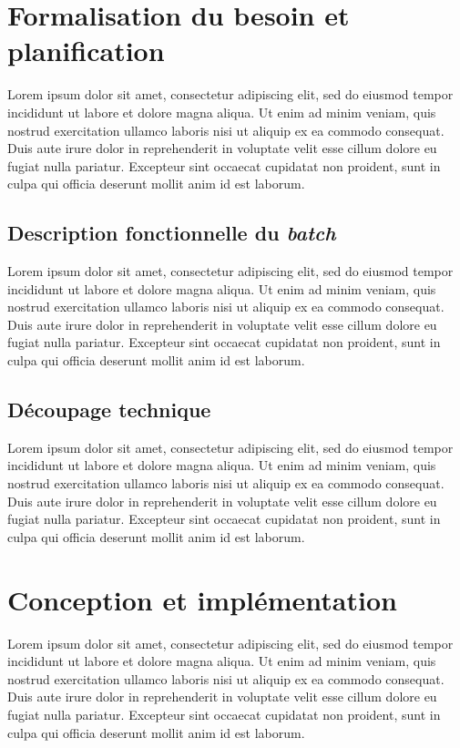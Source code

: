 \documentclass[a4paper, 12pt]{report}
\begin{document}
\section{Formalisation du besoin et planification}

Lorem ipsum dolor sit amet, consectetur adipiscing elit, sed do eiusmod tempor incididunt ut labore et dolore magna aliqua. Ut enim ad minim veniam, quis nostrud exercitation ullamco laboris nisi ut aliquip ex ea commodo consequat. Duis aute irure dolor in reprehenderit in voluptate velit esse cillum dolore eu fugiat nulla pariatur. Excepteur sint occaecat cupidatat non proident, sunt in culpa qui officia deserunt mollit anim id est laborum.

\subsection{Description fonctionnelle du \textit{batch}}

Lorem ipsum dolor sit amet, consectetur adipiscing elit, sed do eiusmod tempor incididunt ut labore et dolore magna aliqua. Ut enim ad minim veniam, quis nostrud exercitation ullamco laboris nisi ut aliquip ex ea commodo consequat. Duis aute irure dolor in reprehenderit in voluptate velit esse cillum dolore eu fugiat nulla pariatur. Excepteur sint occaecat cupidatat non proident, sunt in culpa qui officia deserunt mollit anim id est laborum.

\subsection{Découpage technique}

Lorem ipsum dolor sit amet, consectetur adipiscing elit, sed do eiusmod tempor incididunt ut labore et dolore magna aliqua. Ut enim ad minim veniam, quis nostrud exercitation ullamco laboris nisi ut aliquip ex ea commodo consequat. Duis aute irure dolor in reprehenderit in voluptate velit esse cillum dolore eu fugiat nulla pariatur. Excepteur sint occaecat cupidatat non proident, sunt in culpa qui officia deserunt mollit anim id est laborum.

\section{Conception et implémentation}

Lorem ipsum dolor sit amet, consectetur adipiscing elit, sed do eiusmod tempor incididunt ut labore et dolore magna aliqua. Ut enim ad minim veniam, quis nostrud exercitation ullamco laboris nisi ut aliquip ex ea commodo consequat. Duis aute irure dolor in reprehenderit in voluptate velit esse cillum dolore eu fugiat nulla pariatur. Excepteur sint occaecat cupidatat non proident, sunt in culpa qui officia deserunt mollit anim id est laborum.
\end{document}
